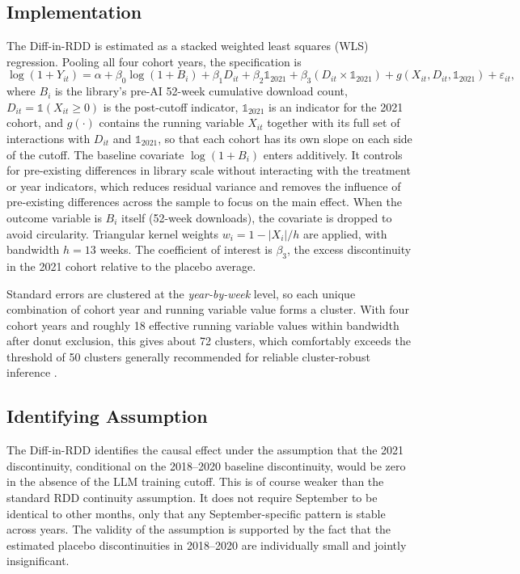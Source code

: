 \documentclass[12pt, a4paper]{report}
\begin{document}
\subsection{Implementation}
The Diff-in-RDD is estimated as a stacked weighted least squares (WLS) regression. Pooling all four cohort years, the specification is
$$\log(1 + Y_{it}) = \alpha + \beta_0 \log(1 + B_i) + \beta_1 D_{it} + \beta_2 \mathbb{1}_{2021} + \beta_3 (D_{it} \times \mathbb{1}_{2021}) + g(X_{it}, D_{it}, \mathbb{1}_{2021}) + \varepsilon_{it},$$
where $B_i$ is the library's pre-AI 52-week cumulative download count, $D_{it} = \mathbb{1}(X_{it} \geq 0)$ is the post-cutoff indicator, $\mathbb{1}_{2021}$ is an indicator for the 2021 cohort, and $g(\cdot)$ contains the running variable $X_{it}$ together with its full set of interactions with $D_{it}$ and $\mathbb{1}_{2021}$, so that each cohort has its own slope on each side of the cutoff. The baseline covariate $\log(1 + B_i)$ enters additively. It controls for pre-existing differences in library scale without interacting with the treatment or year indicators, which reduces residual variance and removes the influence of pre-existing differences across the sample to focus on the main effect. When the outcome variable is $B_i$ itself (52-week downloads), the covariate is dropped to avoid circularity. Triangular kernel weights $w_i = 1 - |X_i|/h$ are applied, with bandwidth $h = 13$ weeks. The coefficient of interest is $\beta_3$, the excess discontinuity in the 2021 cohort relative to the placebo average.

Standard errors are clustered at the \textit{year-by-week} level, so each unique combination of cohort year and running variable value forms a cluster. With four cohort years and roughly 18 effective running variable values within bandwidth after donut exclusion, this gives about 72 clusters, which comfortably exceeds the threshold of 50 clusters generally recommended for reliable cluster-robust inference \citep{cameron2008bootstrap, cameron2015practitioner}.

\subsection{Identifying Assumption}
The Diff-in-RDD identifies the causal effect under the assumption that the 2021 discontinuity, conditional on the 2018--2020 baseline discontinuity, would be zero in the absence of the LLM training cutoff. This is of course weaker than the standard RDD continuity assumption. It does not require September to be identical to other months, only that any September-specific pattern is stable across years. The validity of the assumption is supported by the fact that the estimated placebo discontinuities in 2018--2020 are individually small and jointly insignificant.
\end{document}
